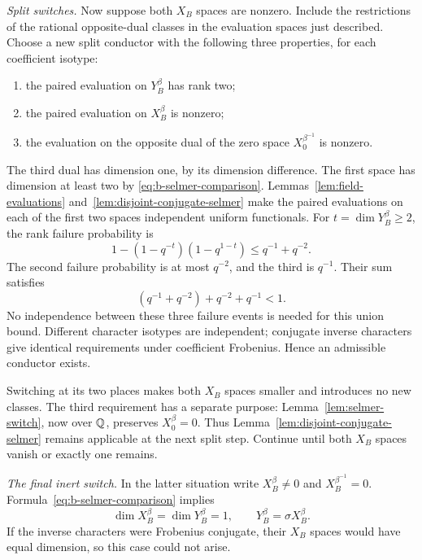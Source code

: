 \smallskip
\noindent\emph{Split switches.}
Now suppose both $X_B$ spaces are nonzero.  Include the restrictions
of the rational opposite-dual classes in the evaluation spaces just
described.  Choose a new split conductor
with the following three properties, for each coefficient isotype:
\begin{enumerate}
\item the paired evaluation on $Y_B^\beta$ has rank two;
\item the paired evaluation on $X_B^\beta$ is nonzero;
\item the evaluation on the opposite dual of the zero space
$X_0^{\beta^{-1}}$ is nonzero.
\end{enumerate}
The third dual has dimension one, by its dimension difference.
The first space has dimension at least two by
\eqref{eq:b-selmer-comparison}.  Lemmas~\ref{lem:field-evaluations}
and~\ref{lem:disjoint-conjugate-selmer} make the paired evaluations
on each of the first two spaces independent uniform functionals.
For $t=\dim Y_B^\beta\ge2$, the rank failure probability is
\[
  1-(1-q^{-t})(1-q^{1-t})\le q^{-1}+q^{-2}.
\]
The second failure probability is at most $q^{-2}$, and the third
is $q^{-1}$.  Their sum satisfies
\begin{equation}\label{eq:split-switch-probability}
            (q^{-1}+q^{-2})+q^{-2}+q^{-1}<1.
\end{equation}
No independence between these three failure events is needed for
this union bound.  Different character isotypes are independent;
conjugate inverse characters give identical requirements under
coefficient Frobenius.  Hence an admissible conductor exists.

Switching at its two places makes both $X_B$ spaces smaller and
introduces no new classes.  The third requirement has a separate
purpose: Lemma~\ref{lem:selmer-switch}, now over $\mathbb Q$, preserves
$X_0^\beta=0$.  Thus Lemma~\ref{lem:disjoint-conjugate-selmer}
remains applicable at the next split step.  Continue until both
$X_B$ spaces vanish or exactly one remains.

\smallskip
\noindent\emph{The final inert switch.}
In the latter situation write $X_B^\beta\ne0$ and
$X_B^{\beta^{-1}}=0$.  Formula~\eqref{eq:b-selmer-comparison}
implies
\begin{equation}\label{eq:one-survivor}
 \dim X_B^\beta=\dim Y_B^\beta=1,
            \qquad Y_B^\beta=\sigma X_B^\beta.
\end{equation}
If the inverse characters were Frobenius conjugate, their $X_B$
spaces would have equal dimension, so this case could not arise.

